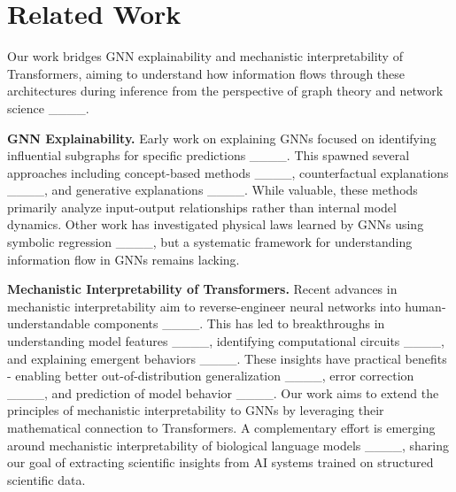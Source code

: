 \section{Related Work}
Our work bridges GNN explainability and mechanistic interpretability of Transformers, aiming to understand how information flows through these architectures during inference from the perspective of graph theory and network science ____.

\textbf{GNN Explainability.} Early work on explaining GNNs focused on identifying influential subgraphs for specific predictions ____. This spawned several approaches including concept-based methods ____, counterfactual explanations ____, and generative explanations ____. While valuable, these methods primarily analyze input-output relationships rather than internal model dynamics. Other work has investigated physical laws learned by GNNs using symbolic regression ____, but a systematic framework for understanding information flow in GNNs remains lacking.

\textbf{Mechanistic Interpretability of Transformers.} Recent advances in mechanistic interpretability aim to reverse-engineer neural networks into human-understandable components ____. This has led to breakthroughs in understanding model features ____, identifying computational circuits ____, and explaining emergent behaviors ____. These insights have practical benefits - enabling better out-of-distribution generalization ____, error correction ____, and prediction of model behavior ____. 
Our work aims to extend the principles of mechanistic interpretability to GNNs by leveraging their mathematical connection to Transformers. 
A complementary effort is emerging around mechanistic interpretability of biological language models ____, sharing our goal of extracting scientific insights from AI systems trained on structured scientific data. 

